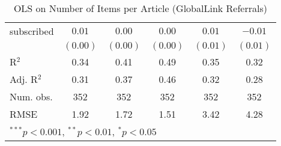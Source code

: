 \begin{table}[!h]
\begin{center}
\begin{tabular}{l c c c c c }
subscribed              & $0.01$       & $0.00$       & $0.00$       & $0.01$       & $-0.01$      \\
                        & $(0.00)$     & $(0.00)$     & $(0.00)$     & $(0.01)$     & $(0.01)$     \\
\midrule
R$^2$                   & 0.34         & 0.41         & 0.49         & 0.35         & 0.32         \\
Adj. R$^2$              & 0.31         & 0.37         & 0.46         & 0.32         & 0.28         \\
Num. obs.               & 352          & 352          & 352          & 352          & 352          \\
RMSE                    & 1.92         & 1.72         & 1.51         & 3.42         & 4.28         \\
\bottomrule
\multicolumn{6}{l}{\scriptsize{$^{***}p<0.001$, $^{**}p<0.01$, $^*p<0.05$}}
\end{tabular}
\caption{OLS on Number of Items per Article (GlobalLink Referrals)}
\label{table:coefficients}
\end{center}
\end{table}
